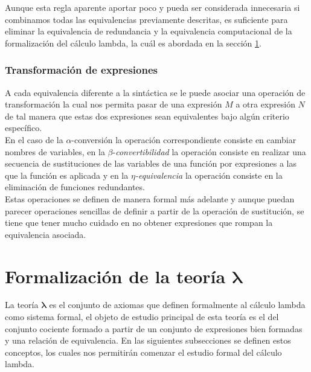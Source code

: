 Aunque esta regla aparente aportar poco y pueda ser considerada innecesaria si
combinamos todas las equivalencias previamente descritas, es suficiente para
eliminar la equivalencia de redundancia y la equivalencia computacional de la
formalización del cálculo lambda, la cuál es abordada en la sección
\ref{sec:1.2}.\\


\subsubsection{Transformación de expresiones}

A cada equivalencia diferente a la sintáctica se le puede asociar una operación
de transformación la cual nos permita pasar de una expresión \(M\) a otra
expresión \(N\) de tal manera que estas dos expresiones sean equivalentes bajo
algún criterio específico.\\

En el caso de la \(\alpha\)-conversión la operación correspondiente consiste en cambiar
nombres de variables, en la \(\beta\)-\emph{convertibilidad} la operación
consiste en realizar una secuencia de sustituciones de las variables de una
función por expresiones a las que la función es aplicada y en la
\(\eta\)\emph{-equivalencia} la operación consiste en la eliminación de
funciones redundantes.\\

Estas operaciones se definen de manera formal más adelante y aunque puedan
parecer operaciones sencillas de definir a partir de la operación de
sustitución, se tiene que tener mucho cuidado en no obtener expresiones que
rompan la equivalencia asociada.\\

\section{Formalización de la teoría
\texorpdfstring{$\boldsymbol\lambda$}{lambda}} \label{sec:1.2}

La teoría \(\boldsymbol\lambda\) es el conjunto de axiomas que definen
formalmente al cálculo lambda como sistema formal, el objeto de estudio
principal de esta teoría es el del conjunto cociente formado a partir de un
conjunto de expresiones bien formadas y una relación de equivalencia. En las
siguientes subsecciones se definen estos conceptos, los cuales nos permitirán
comenzar el estudio formal del cálculo lambda.\\

